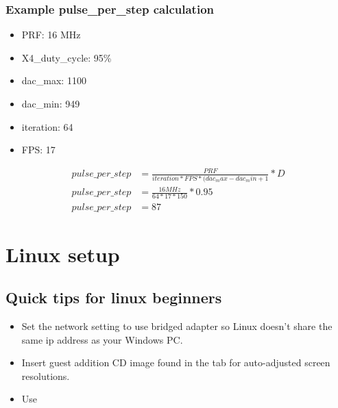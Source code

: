 \documentclass[letterpaper,10pt,english]{sphinxmanual}
\begin{document}
\subsubsection{Example pulse\_per\_step calculation}
\label{\detokenize{Radar information:example-pulse-per-step-calculation}}\begin{itemize}
\item {} 
PRF: 16 MHz

\item {} 
X4\_duty\_cycle: 95\%

\item {} 
dac\_max: 1100

\item {} 
dac\_min: 949

\item {} 
iteration: 64

\item {} 
FPS: 17

\end{itemize}
\begin{equation*}
\begin{split}pulse\_per\_step &= \frac{PRF}{iteration*FPS*(dac_max-dac_min+1} * D \\
pulse\_per\_step  &= \frac{16 MHz}{64*17*150} * 0.95 \\
pulse\_per\_step  &= 87\end{split}
\end{equation*}

\section{Linux setup}
\label{\detokenize{Linux setup:linux-setup}}\label{\detokenize{Linux setup::doc}}




\subsection{Quick tips for linux beginners}
\label{\detokenize{Linux setup:quick-tips-for-linux-beginners}}\begin{itemize}
\item {} 
Set the network setting to use bridged adapter so Linux doesn’t share the same ip address as your Windows PC.

\item {} 
Insert guest addition CD image found in the  tab for auto-adjusted screen resolutions.

\item {} 
Use 

\end{itemize}
\end{document}
